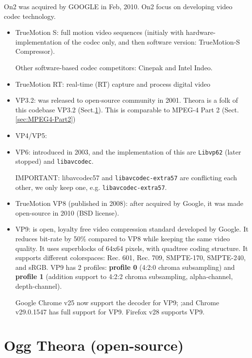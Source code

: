 On2 was acquired by GOOGLE in Feb, 2010. On2 focus on developing video codec
technology.
\begin{itemize}
  \item TrueMotion S: full motion video sequences (initialy with
  hardware-implementation of the codec only, and then software version:
  TrueMotion-S Compressor).
  
  Other software-based codec competitors: Cinepak and Intel Indeo.
    
  \item TrueMotion RT: real-time (RT) capture and process digital video
  \item VP3.2: was released to open-source community in 2001. Theora is a folk
  of this codebase VP3.2 (Sect.\ref{sec:Theora}). This is comparable to MPEG-4
  Part 2 (Sect.\ref{sec:MPEG4-Part2})
  
  \item VP4/VP5:
  
  \item VP6: introduced in 2003, and the implementation of this are
  \verb!Libvp62! (later stopped) and \verb!libavcodec!.  
  
  IMPORTANT: libavcodec57 and \verb!libavcodec-extra57! are conflicting each other, we only keep one, e.g. 
  \verb!libavcodec-extra57!.
  
  \item TrueMotion VP8 (published in 2008): after acquired by Google, it was
  made open-source in 2010 (BSD license).
  
  \item VP9: is open, loyalty free video compression standard developed by
  Google. It reduces bit-rate by 50\% compared to VP8 while keeping the same
  video quality. It uses superblocks of 64x64 pixels, with quadtree coding
  structure. It supports different colorspaces: Rec. 601, Rec. 709, SMPTE-170,
  SMPTE-240, and sRGB. VP9 has 2 profiles: {\bf profile 0 } (4:2:0 chroma
  subsampling) and {\bf profile 1} (addition support to 4:2:2 chroma
  subsampling, alpha-channel, depth-channel).
  
  Google Chrome v25 now support the decoder for VP9; ;and Chrome
  v29.0.1547 has full support for VP9. Firefox v28 supports VP9.
\end{itemize}

\section{Ogg Theora (open-source)}
\label{sec:Theora}

